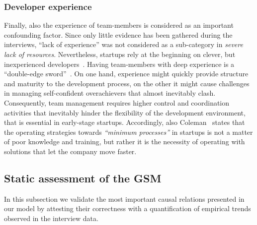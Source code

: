 \documentclass[10pt,journal,letterpaper,compsoc]{IEEEtran}
\begin{document}
\subsubsection{Developer experience} 
Finally, also the experience of team-members is considered as an important 
confounding factor. Since only little evidence has been gathered during the 
interviews, ``lack of experience'' was not considered as a sub-category in 
\textit{severe lack of resources}.
Nevertheless, startups rely at the beginning on clever, but inexperienced
developers~\cite{Crowne2002}. Having team-members with deep experience is a
``double-edge sword''~\cite{Yoffie1999}. On one hand, experience might quickly
provide structure and maturity to the development process, on the other it
might cause challenges in managing self-confident overachievers that almost
inevitably clash. Consequently, team management requires higher control and
coordination activities that inevitably hinder the flexibility of the
development environment, that is essential in early-stage startups.
Accordingly, also Coleman~\cite{Coleman2007, Coleman2008a,Coleman2008} states
that the operating strategies towards \textit{``minimum processes''} in
startups is not a matter of poor knowledge and training, but rather it is the
necessity of operating with solutions that let the company move faster.


\subsection{Static assessment of the GSM} \label{sect:theory:validation:stats}

In this subsection we validate the most important causal relations presented in 
our model by attesting their correctness with a quantification of empirical 
trends observed in the interview data. 
\end{document}
